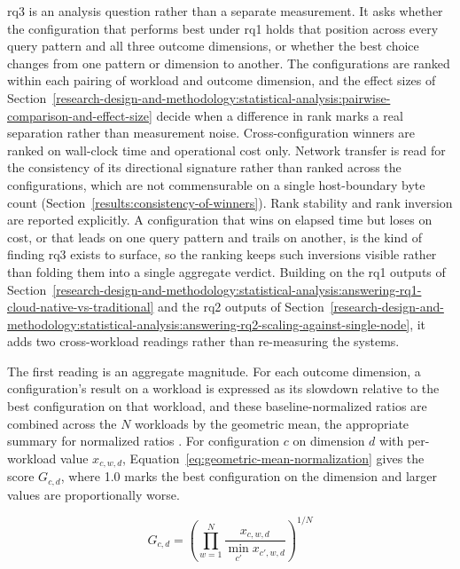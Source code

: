 \acrshort{rq}3 is an analysis question rather than a separate measurement. It asks whether the configuration that performs best under \acrshort{rq}1 holds that position across every query pattern and all three outcome dimensions, or whether the best choice changes from one pattern or dimension to another. The configurations are ranked within each pairing of workload and outcome dimension, and the effect sizes of Section~\ref{research-design-and-methodology:statistical-analysis:pairwise-comparison-and-effect-size} decide when a difference in rank marks a real separation rather than measurement noise. Cross-configuration winners are ranked on wall-clock time and operational cost only. Network transfer is read for the consistency of its directional signature rather than ranked across the configurations, which are not commensurable on a single host-boundary byte count (Section~\ref{results:consistency-of-winners}). Rank stability and rank inversion are reported explicitly. A configuration that wins on elapsed time but loses on cost, or that leads on one query pattern and trails on another, is the kind of finding \acrshort{rq}3 exists to surface, so the ranking keeps such inversions visible rather than folding them into a single aggregate verdict. Building on the \acrshort{rq}1 outputs of Section~\ref{research-design-and-methodology:statistical-analysis:answering-rq1-cloud-native-vs-traditional} and the \acrshort{rq}2 outputs of Section~\ref{research-design-and-methodology:statistical-analysis:answering-rq2-scaling-against-single-node}, it adds two cross-workload readings rather than re-measuring the systems.

The first reading is an aggregate magnitude. For each outcome dimension, a configuration's result on a workload is expressed as its slowdown relative to the best configuration on that workload, and these baseline-normalized ratios are combined across the $N$ workloads by the geometric mean, the appropriate summary for normalized ratios \parencite{fleming1986_how_not_to_lie_with_statistics}. For configuration $c$ on dimension $d$ with per-workload value $x_{c,w,d}$, Equation~\ref{eq:geometric-mean-normalization} gives the score $G_{c,d}$, where \num{1.0} marks the best configuration on the dimension and larger values are proportionally worse.

\begin{equation}
	G_{c,d} = \left( \prod_{w=1}^{N} \frac{x_{c,w,d}}{\min_{c'} x_{c',w,d}} \right)^{1/N}
	\label{eq:geometric-mean-normalization}
\end{equation}


